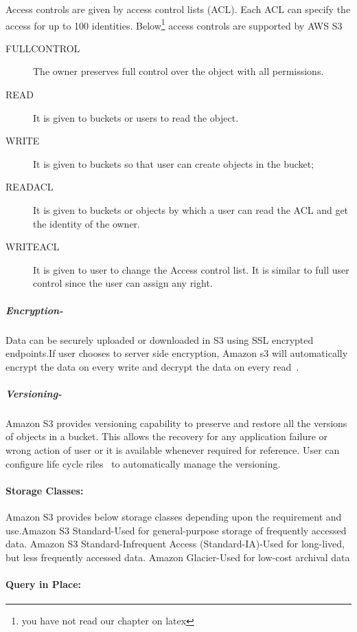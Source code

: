 Access controls are given by access control lists (ACL). Each ACL can
specify the access for up to 100 identities.  Below\footnote{you have
  not read our chapter on latex} access controls are supported by AWS
S3

\begin{description}
\item [FULLCONTROL] The owner preserves full control over the object with all
permissions.
\item [READ] It is given to buckets or users to read the object. 
\item [WRITE] It is given to buckets so that user can create objects in the
bucket;
\item [READACL] It is given to buckets or objects by which a user can read the
ACL and get the identity of the owner.
\item [WRITEACL] It is given to user to change the Access control list. It is
similar to full
user control since the user can assign any right.
\end{description}

\subparagraph{Encryption-}

Data can be securely uploaded or downloaded in S3 using SSL encrypted
endpoints.If user chooses to server side encryption, Amazon s3 will
automatically encrypt
the data on every write and decrypt the data on every
read~\cite{hid-sp18-420-amazon-S3-data-encryption}.

\subparagraph{Versioning-}

Amazon S3 provides versioning capability to preserve and restore all the
versions of objects in a bucket. This allows the recovery for any application
failure or wrong action of user or it is available whenever required for
reference. User can configure life cycle
riles~\cite{hid-sp18-420-amazon-S3-lidecycle-rule} to automatically manage the
versioning.

\paragraph{Storage Classes:}

Amazon S3 provides below storage classes depending upon the requirement and use.Amazon S3 Standard-Used for general-purpose storage of frequently accessed
data.
Amazon S3 Standard-Infrequent Access (Standard-IA)-Used for long-lived, but
less frequently accessed data.
Amazon Glacier-Used for low-cost archival data


\paragraph{Query in Place:} 

